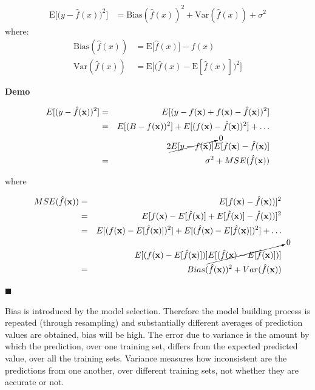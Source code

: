 \begin{align}
\label{eq:bvtrade}
\mathrm{E}\Big[\big(y - \hat{f}(x)\big)^2\Big]
 & = \mathrm{Bias}(\hat{f}(x))^2 + \mathrm{Var}(\hat{f}(x)) + \sigma^2
\end{align}
\noindent where:
\begin{align*}
 \mathrm{Bias}(\hat{f}(x)) &= \mathrm{E}\big[\hat{f}(x)\big] - f(x) \\
 \mathrm{Var}(\hat{f}(x)) &= \mathrm{E}\Big[ \big( \hat{f}(x) - \mathrm{E}[\hat{f}(x)] \big)^2 \Big] 
\end{align*}


\textbf{Demo}\quad

\begin{eqnarray*}
E[(y-\hat{f}(\mathbf{x}))^2] & =&
E[(y-f(\mathbf{x})+f(\mathbf{x})-\hat{f}(\mathbf{x}))^2] \\
&=& E[(B-f(\mathbf{x}))^2] +
E[(f(\mathbf{x})-\hat{f}(\mathbf{x}))^2] + \dots \\
& &
2\cancelto{0}{E[y-f(\mathbf{x})]}E[f(\mathbf{x})-\hat{f}(\mathbf{x})] \\
&=& \sigma^2 + MSE(\hat{f}(\mathbf{x}))
\end{eqnarray*}

\noindent where 

\begin{eqnarray*}
    MSE(\hat{f}(\mathbf{x})) &=&
    E[f(\mathbf{x})-\hat{f}(\mathbf{x}))]^2 \\
    &=& E[f(\mathbf{x})-E[\hat{f}(\mathbf{x})] +
    E[\hat{f}(\mathbf{x})]-\hat{f}(\mathbf{x}))]^2 \\
    &=&  E[(f(\mathbf{x})-E[\hat{f}(\mathbf{x})])^2] +
      E[(\hat{f}(\mathbf{x})-E[\hat{f}(\mathbf{x})])^2] + \dots\\
    & & E[(f(\mathbf{x})-E[\hat{f}(\mathbf{x})])] 
    \cancelto{0}{E[(\hat{f}(\mathbf{x})-E[\hat{f}(\mathbf{x})])]} \\
    &=& Bias(\hat{f}(\mathbf{x}))^2 + Var(\hat{f}(\mathbf{x}))
\end{eqnarray*}

$\blacksquare$

Bias is introduced by the model selection. Therefore the model building process is repeated (through resampling) and substantially different averages of prediction values are obtained, bias will be high. The error due to variance is the amount by which the prediction, over one training set, differs from the expected predicted value, over all the training sets. Variance measures how inconsistent are the predictions from one another, over different training sets, not whether they are accurate or not.

